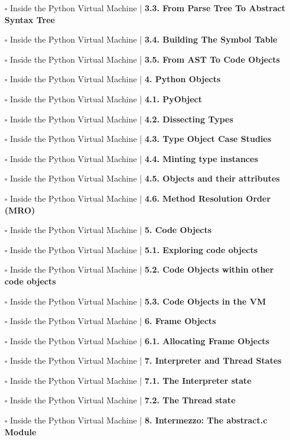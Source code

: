 \documentclass[a4, landscape, 12pt]{article}
\newcommand{\checkbox}{$\square$}%
\begin{document}
\begin{itemize}
\item [\checkbox]  Inside the Python Virtual Machine  | \textbf{ 3.3. From Parse Tree To Abstract Syntax Tree
}
\item [\checkbox]  Inside the Python Virtual Machine  | \textbf{ 3.4. Building The Symbol Table
}
\item [\checkbox]  Inside the Python Virtual Machine  | \textbf{ 3.5. From AST To Code Objects
}
\item [\checkbox]  Inside the Python Virtual Machine  | \textbf{ 4. Python Objects
}
\item [\checkbox]  Inside the Python Virtual Machine  | \textbf{ 4.1. PyObject
}
\item [\checkbox]  Inside the Python Virtual Machine  | \textbf{ 4.2. Dissecting Types
}
\item [\checkbox]  Inside the Python Virtual Machine  | \textbf{ 4.3. Type Object Case Studies
}
\item [\checkbox]  Inside the Python Virtual Machine  | \textbf{ 4.4. Minting type instances
}
\item [\checkbox]  Inside the Python Virtual Machine  | \textbf{ 4.5. Objects and their attributes
}
\item [\checkbox]  Inside the Python Virtual Machine  | \textbf{ 4.6. Method Resolution Order (MRO)
}
\item [\checkbox]  Inside the Python Virtual Machine  | \textbf{ 5. Code Objects
}
\item [\checkbox]  Inside the Python Virtual Machine  | \textbf{ 5.1. Exploring code objects
}
\item [\checkbox]  Inside the Python Virtual Machine  | \textbf{ 5.2. Code Objects within other code objects
}
\item [\checkbox]  Inside the Python Virtual Machine  | \textbf{ 5.3. Code Objects in the VM
}
\item [\checkbox]  Inside the Python Virtual Machine  | \textbf{ 6. Frame Objects
}
\item [\checkbox]  Inside the Python Virtual Machine  | \textbf{ 6.1. Allocating Frame Objects
}
\item [\checkbox]  Inside the Python Virtual Machine  | \textbf{ 7. Interpreter and Thread States
}
\item [\checkbox]  Inside the Python Virtual Machine  | \textbf{ 7.1. The Interpreter state
}
\item [\checkbox]  Inside the Python Virtual Machine  | \textbf{ 7.2. The Thread state
}
\item [\checkbox]  Inside the Python Virtual Machine  | \textbf{ 8. Intermezzo: The abstract.c Module
}
\end{itemize}
\end{document}
